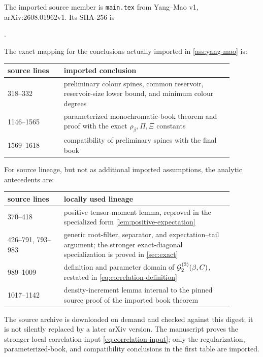 The imported source member is \texttt{main.tex} from Yang--Mao v1,
arXiv:2608.01962v1.  Its SHA-256 is
\begin{center}
.
\end{center}
The exact mapping for the conclusions actually imported in
\cref{ass:yang-mao} is:
\begin{center}
\begin{tabular}{p{0.22\linewidth}p{0.66\linewidth}}
\toprule
source lines & imported conclusion\\
\midrule
318--332 & preliminary colour spines, common reservoir, reservoir-size
lower bound, and minimum colour degrees\\
1146--1565 & parameterized monochromatic-book theorem and proof with the
exact \(\rho_\beta,\Pi,\Xi\) constants\\
1569--1618 & compatibility of preliminary spines with the final book\\
\bottomrule
\end{tabular}
\end{center}
For source lineage, but not as additional imported assumptions, the analytic
antecedents are:
\begin{center}
\begin{tabular}{p{0.22\linewidth}p{0.66\linewidth}}
\toprule
source lines & locally used lineage\\
\midrule
370--418 & positive tensor-moment lemma, reproved in the specialized form
\cref{lem:positive-expectation}\\
426--791, 793--983 & generic root-filter, separator, and expectation--tail
argument; the stronger exact-diagonal specialization is proved in
\cref{sec:exact}\\
989--1009 & definition and parameter domain of
\(\mathcal G_2^{(3)}(\beta,C)\), restated in
\eqref{eq:correlation-definition}\\
1017--1142 & density-increment lemma internal to the pinned source proof of
the imported book theorem\\
\bottomrule
\end{tabular}
\end{center}
The source archive is downloaded on demand and checked against this digest;
it is not silently replaced by a later arXiv version.  The manuscript proves
the stronger local correlation input \eqref{eq:correlation-input}; only the
regularization, parameterized-book, and compatibility conclusions in the
first table are imported.

